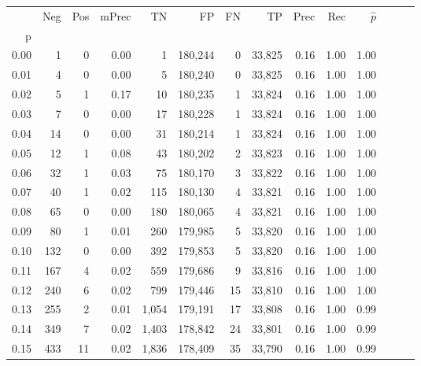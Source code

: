 \begin{tabular}{rrrrrrrrrrrrrr}
\toprule
{} &    Neg &  Pos & mPrec &       TN &       FP &      FN &      TP &  Prec &   Rec & $\hat{p}$ \\
p    &        &      &       &          &          &         &         &       &       &           \\
\midrule
0.00 &      1 &    0 &  0.00 &        1 &  180,244 &       0 &  33,825 &  0.16 &  1.00 &      1.00 \\
0.01 &      4 &    0 &  0.00 &        5 &  180,240 &       0 &  33,825 &  0.16 &  1.00 &      1.00 \\
0.02 &      5 &    1 &  0.17 &       10 &  180,235 &       1 &  33,824 &  0.16 &  1.00 &      1.00 \\
0.03 &      7 &    0 &  0.00 &       17 &  180,228 &       1 &  33,824 &  0.16 &  1.00 &      1.00 \\
0.04 &     14 &    0 &  0.00 &       31 &  180,214 &       1 &  33,824 &  0.16 &  1.00 &      1.00 \\
0.05 &     12 &    1 &  0.08 &       43 &  180,202 &       2 &  33,823 &  0.16 &  1.00 &      1.00 \\
0.06 &     32 &    1 &  0.03 &       75 &  180,170 &       3 &  33,822 &  0.16 &  1.00 &      1.00 \\
0.07 &     40 &    1 &  0.02 &      115 &  180,130 &       4 &  33,821 &  0.16 &  1.00 &      1.00 \\
0.08 &     65 &    0 &  0.00 &      180 &  180,065 &       4 &  33,821 &  0.16 &  1.00 &      1.00 \\
0.09 &     80 &    1 &  0.01 &      260 &  179,985 &       5 &  33,820 &  0.16 &  1.00 &      1.00 \\
0.10 &    132 &    0 &  0.00 &      392 &  179,853 &       5 &  33,820 &  0.16 &  1.00 &      1.00 \\
0.11 &    167 &    4 &  0.02 &      559 &  179,686 &       9 &  33,816 &  0.16 &  1.00 &      1.00 \\
0.12 &    240 &    6 &  0.02 &      799 &  179,446 &      15 &  33,810 &  0.16 &  1.00 &      1.00 \\
0.13 &    255 &    2 &  0.01 &    1,054 &  179,191 &      17 &  33,808 &  0.16 &  1.00 &      0.99 \\
0.14 &    349 &    7 &  0.02 &    1,403 &  178,842 &      24 &  33,801 &  0.16 &  1.00 &      0.99 \\
0.15 &    433 &   11 &  0.02 &    1,836 &  178,409 &      35 &  33,790 &  0.16 &  1.00 &      0.99 \\

\end{tabular}
